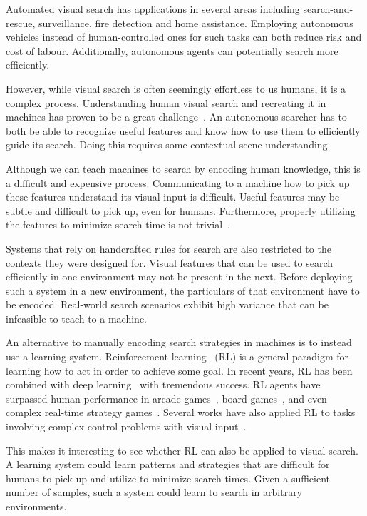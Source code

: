 Automated visual search has applications in several areas including search-and-rescue, surveillance, fire detection and home assistance.
Employing autonomous vehicles instead of human-controlled ones for such tasks can both reduce risk and cost of labour.
Additionally, autonomous agents can potentially search more efficiently.

However, while visual search is often seemingly effortless to us humans, it is a complex process.
Understanding human visual search and recreating it in machines has proven to be a great challenge~\cite{eckstein_visual_2011}.
An autonomous searcher has to both be able to recognize useful features and know how to use them to efficiently guide its search.
Doing this requires some contextual scene understanding.

Although we can teach machines to search by encoding human knowledge, this is a difficult and expensive process.
Communicating to a machine how to pick up these features understand its visual input is difficult.
Useful features may be subtle and difficult to pick up, even for humans.
Furthermore, properly utilizing the features to minimize search time is not trivial~\cite{ye_complexity-level_2001}.

Systems that rely on handcrafted rules for search are also restricted to the contexts they were designed for.
Visual features that can be used to search efficiently in one environment may not be present in the next.
Before deploying such a system in a new environment, the particulars of that environment have to be encoded.
Real-world search scenarios exhibit high variance that can be infeasible to teach to a machine.

An alternative to manually encoding search strategies in machines is to instead use a learning system.
Reinforcement learning~\cite{sutton_reinforcement_2018} (RL) is a general paradigm for learning how to act in order to achieve some goal.
In recent years, RL has been combined with deep learning~\cite{goodfellow_deep_2016} with tremendous success.
RL agents have surpassed human performance in arcade games~\cite{mnih_human-level_2015}, board games~\cite{silver_mastering_2016}, and even complex real-time strategy games~\cite{vinyals_grandmaster_2019}. 
Several works have also applied RL to tasks involving complex control problems with visual input~\cite{minut_reinforcement_2001,mnih_recurrent_2014,zhu_target-driven_2017,mirowski_learning_2017}.

This makes it interesting to see whether RL can also be applied to visual search.
A learning system could learn patterns and strategies that are difficult for humans to pick up and utilize to minimize search times.
Given a sufficient number of samples, such a system could learn to search in arbitrary environments.

